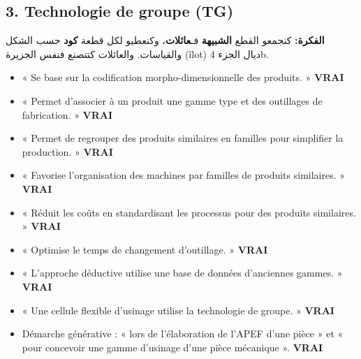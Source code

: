 \documentclass[11pt,a4paper]{article}
\newcommand{\fr}[1]{\textfrench{#1}}
\newcommand{\vrai}{\textcolor{vert}{\textbf{VRAI}}}
\begin{document}
\subsection*{3. Technologie de groupe (TG)}
\par\begin{Arabic}
\textbf{الفكرة:} كنجمعو القطع \textbf{الشبيهة} فـ\textbf{عائلات}، وكنعطيو لكل قطعة \textbf{كود} حسب الشكل والقياسات. والعائلات كتتصنع فنفس الجزيرة (\fr{îlot}) ديال الجزء \fr{4b}.
\end{Arabic}
\begin{examen}
\begin{itemize}
\item « Se base sur la codification morpho-dimensionnelle des produits. » \vrai
\item « Permet d'associer à un produit une gamme type et des outillages de fabrication. » \vrai
\item « Permet de regrouper des produits similaires en familles pour simplifier la production. » \vrai
\item « Favorise l'organisation des machines par familles de produits similaires. » \vrai
\item « Réduit les coûts en standardisant les processus pour des produits similaires. » \vrai
\item « Optimise le temps de changement d'outillage. » \vrai
\item « L'approche déductive utilise une base de données d'anciennes gammes. » \vrai
\item « Une cellule flexible d'usinage utilise la technologie de groupe. » \vrai
\item Démarche générative : « lors de l'élaboration de l'APEF d'une pièce » et « pour concevoir une gamme d'usinage d'une pièce mécanique ». \vrai
\end{itemize}
\end{examen}
\end{document}
